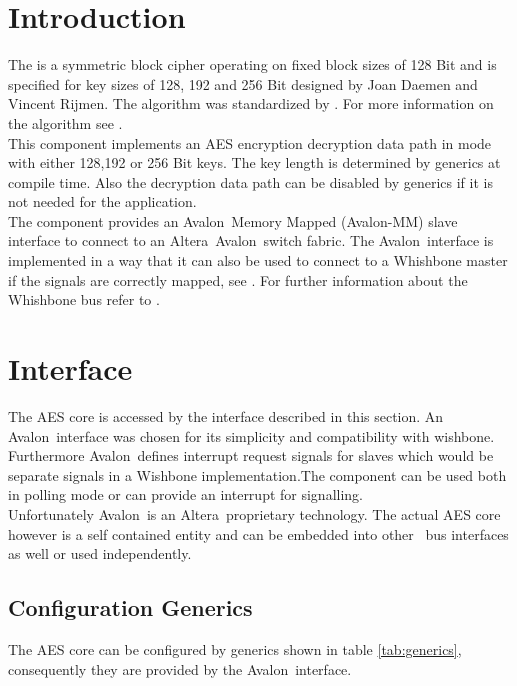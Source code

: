\documentclass{ruschidoc}
\begin{document}
\maketitle
\newpage
\tableofcontents
\newpage

\section{Introduction}
\label{sec:intro} The \AES is a symmetric block cipher operating on fixed block sizes
of 128 Bit and is specified for key sizes of 128, 192 and 256 Bit designed by Joan
Daemen and Vincent Rijmen. The algorithm was standardized by \NIST. For more
information on the algorithm see \cite{NIST:Fips197}.\\
This component implements an AES encryption decryption data path in \ECB mode with
either 128,192 or 256 Bit keys.  The key length is determined by generics at compile
time. Also the decryption data path can be disabled by generics if it is not needed
for the application.\\
The component provides an Avalon\rtm\ Memory Mapped (Avalon-MM) slave interface to
connect to an Altera\rtm\ Avalon\rtm\ switch fabric. The Avalon\rtm\ interface is
implemented in a way that it can also be used to connect to a Whishbone master if the
signals are correctly mapped, see \cite{Wiki:AvWb}. For further information about the 
Whishbone bus refer to \cite{OC:WBspec}. \\

\section{Interface}
\label{sec:interface}
The AES core is accessed by the interface described in this section. An Avalon\rtm\
interface was chosen for its simplicity and compatibility with wishbone.  Furthermore
Avalon\rtm\ defines interrupt request signals for slaves which would be separate
signals in a Wishbone implementation.The component can be used both in polling 
mode or can provide an interrupt for signalling. \\
Unfortunately Avalon\rtm\ is an Altera\rtm\ proprietary technology. The actual AES
core however is a self contained entity and can be embedded into other \SoC\ bus
interfaces as well or used independently.

\subsection{Configuration Generics}
\label{sec:generics}
The AES core can be configured by generics shown in table \ref{tab:generics},
consequently they are provided by the Avalon\rtm\ interface.
\end{document}
